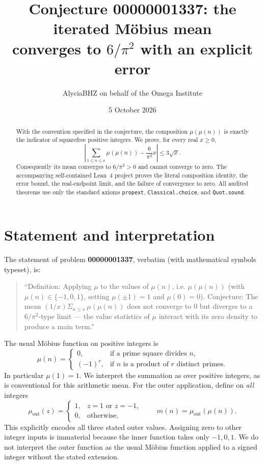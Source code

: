 \documentclass[11pt]{article}
\title{Conjecture 00000001337: the iterated M\"obius mean\\converges to $6/\pi^2$ with an explicit error}
\author{AlyciaBHZ on behalf of the Omega Institute}
\date{5 October 2026}
\newcommand{\mm}{m}
\begin{document}
\maketitle
\begin{abstract}
With the convention specified in the conjecture, the composition
$\mu(\mu(n))$ is exactly the indicator of squarefree positive integers.
We prove, for every real $x\geq0$,
\[
\left|\sum_{1\leq n\leq x}\mu(\mu(n)) - \frac{6}{\pi^2}x\right|
\leq 3\sqrt{x}.
\]
Consequently its mean converges to $6/\pi^2>0$ and cannot converge to zero.
The accompanying self-contained Lean~4 project proves the literal
composition identity, the error bound, the real-endpoint limit, and the
failure of convergence to zero. All audited theorems use only the standard
axioms \texttt{propext}, \texttt{Classical.choice}, and \texttt{Quot.sound}.
\end{abstract}

\section{Statement and interpretation}
The statement of problem \textbf{00000001337}, verbatim (with
mathematical symbols typeset), is:
\begin{quote}
``Definition: Applying $\mu$ to the values of $\mu(n)$, i.e.
$\mu(\mu(n))$ (with $\mu(n)\in\{-1,0,1\}$, setting $\mu(\pm1)=1$
and $\mu(0)=0$). Conjecture: The mean
$(1/x)\Sigma_{n\leq x}\,\mu(\mu(n))$ does not converge to 0 but diverges
to a $6/\pi^2$-type limit --- the value statistics of $\mu$ interact with
its zero density to produce a main term.''
\end{quote}

The usual M\"obius function on positive integers is
\[
\mu(n)=\begin{cases}
0,&\text{if a prime square divides }n,\\
(-1)^r,&\text{if }n\text{ is a product of }r\text{ distinct primes}.
\end{cases}
\]
In particular $\mu(1)=1$. We interpret the summation as over positive
integers, as is conventional for this arithmetic mean. For the outer
application, define on \emph{all} integers
\[
\mu_{\mathrm{out}}(z)=
\begin{cases}1,&z=1\text{ or }z=-1,\\0,&\text{otherwise},\end{cases}
\qquad \mm(n)=\mu_{\mathrm{out}}(\mu(n)).
\]
This explicitly encodes all three stated outer values. Assigning zero to
other integer inputs is immaterial because the inner function takes only
$-1,0,1$. We do not interpret the outer function as the usual M\"obius
function applied to a signed integer without the stated extension.
\end{document}
